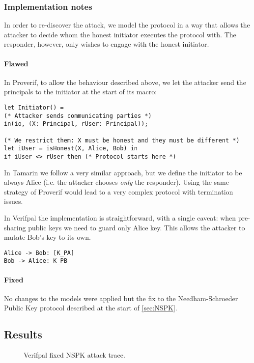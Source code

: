 \subsubsection{Implementation notes}

In order to re-discover the attack, we model the protocol in a way that allows the attacker to decide whom the honest initiator executes the protocol with. The responder, however, only wishes to engage with the honest initiator.

\newpage
\paragraph{Flawed}

In Proverif, to allow the behaviour described above, we let the attacker send the principals to the initiator at the start of its macro:

\lstset{language=proverif}
\begin{lstlisting}
let Initiator() =
(* Attacker sends communicating parties *)
in(io, (X: Principal, rUser: Principal));

(* We restrict them: X must be honest and they must be different *)
let iUser = isHonest(X, Alice, Bob) in
if iUser <> rUser then (* Protocol starts here *)
\end{lstlisting}

In Tamarin we follow a very similar approach, but we define the initiator to be always Alice (i.e. the attacker chooses \textit{only} the responder). Using the same strategy of Proverif would lead to a very complex protocol with termination issues.

In Verifpal the implementation is straightforward, with a single caveat: when pre-sharing public keys we need to guard only Alice key. This allows the attacker to mutate Bob's key to its own.

\lstset{language=verifpal}
\begin{lstlisting} 
Alice -> Bob: [K_PA]
Bob -> Alice: K_PB
\end{lstlisting}


\paragraph{Fixed} No changes to the models were applied but the fix to the Needham-Schroeder Public Key protocol described at the start of \cref{sec:NSPK}.

\subsection{Results}
\begin{figure}[t]
    \centering
    \caption{Verifpal fixed NSPK attack trace.}
    \label{fig:verifpal-nspk-trace}
\end{figure}

